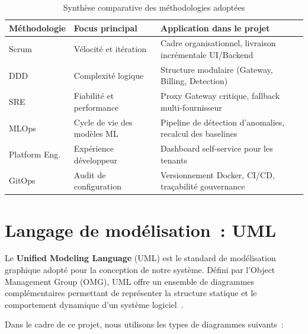 \begin{table}[H]
\centering
\caption{Synthèse comparative des méthodologies adoptées}
\label{tab:methodologies_comparatif}
\begin{tabularx}{\textwidth}{|l|l|X|}
\hline
\textbf{Méthodologie} & \textbf{Focus principal} & \textbf{Application dans le projet} \\
\hline
Scrum & Vélocité et itération & Cadre organisationnel, livraison incrémentale UI/Backend \\
\hline
DDD & Complexité logique & Structure modulaire (Gateway, Billing, Detection) \\
\hline
SRE & Fiabilité et performance & Proxy Gateway critique, fallback multi-fournisseur \\
\hline
MLOps & Cycle de vie des modèles ML & Pipeline de détection d'anomalies, recalcul des baselines \\
\hline
Platform Eng. & Expérience développeur & Dashboard self-service pour les tenants \\
\hline
GitOps & Audit de configuration & Versionnement Docker, CI/CD, traçabilité gouvernance \\
\hline
\end{tabularx}
\end{table}


\section{Langage de modélisation~: UML}
\label{sec:uml}

Le \textbf{Unified Modeling Language} (UML) est le standard de modélisation graphique adopté pour la conception de notre système. Défini par l'Object Management Group (OMG), UML offre un ensemble de diagrammes complémentaires permettant de représenter la structure statique et le comportement dynamique d'un système logiciel~\cite{gamma1994}.

Dans le cadre de ce projet, nous utilisons les types de diagrammes suivants~:

